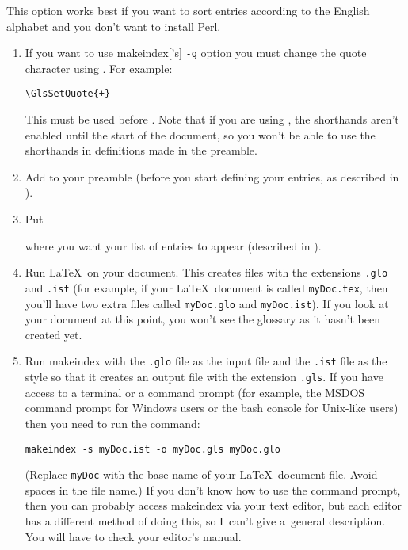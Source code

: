 \documentclass[report,inlinetitle,widecs]{nlctdoc}
\newcommand*{\mkidxopt}[1]{\texttt{-#1}\index{makeindex=\appfmt{makeindex}>#1=\texttt{-#1}|hyperpage}}
\begin{document}
\begin{description}
   This option works best if you want to sort entries according to the
   English alphabet and you don't want to install Perl.

   \begin{enumerate}
    \item If you want to use \gls{makeindex}['s] \mkidxopt{g} option
    you must change the quote character using . For
example:
\begin{verbatim}
\GlsSetQuote{+}
\end{verbatim}
    This must be used before .
    Note that if you are using , the shorthands aren't
    enabled until the start of the document, so you won't be able to use
    the shorthands in definitions made in the preamble.

    \item Add  to your preamble (before you start
    defining your entries, as described in
    ).

    \item Put
\begin{definition}
\end{definition}
    where you want your list of entries to appear (described in
    ).

    \item Run \LaTeX\ on your document. This creates files with the
    extensions \texttt{.glo} and \texttt{.ist} (for example, if your 
    \LaTeX\ document is called \texttt{myDoc.tex}, then you'll have 
    two extra files called \texttt{myDoc.glo} and \texttt{myDoc.ist}).
    If you look at your document at this point, you won't see the 
    glossary as it hasn't been created yet.

    \item Run \gls{makeindex} with the \texttt{.glo} file as the
    input file and the \texttt{.ist} file as the style so that
    it creates an output file with the extension \texttt{.gls}. If
    you have access to a terminal or a command prompt (for example, the
    MSDOS command prompt for Windows users or the bash console for
    Unix-like users) then you need to run the command:
\begin{verbatim}
makeindex -s myDoc.ist -o myDoc.gls myDoc.glo
\end{verbatim}
   (Replace \texttt{myDoc} with the base name of your \LaTeX\
    document file. Avoid spaces in the file name.) If you don't know
    how to use the command prompt, then you can probably access
    \gls{makeindex} via your text editor, but each editor has a
    different method of doing this, so I~can't give a~general
    description. You will have to check your editor's manual.


\end{enumerate}
\end{description}
\end{document}
